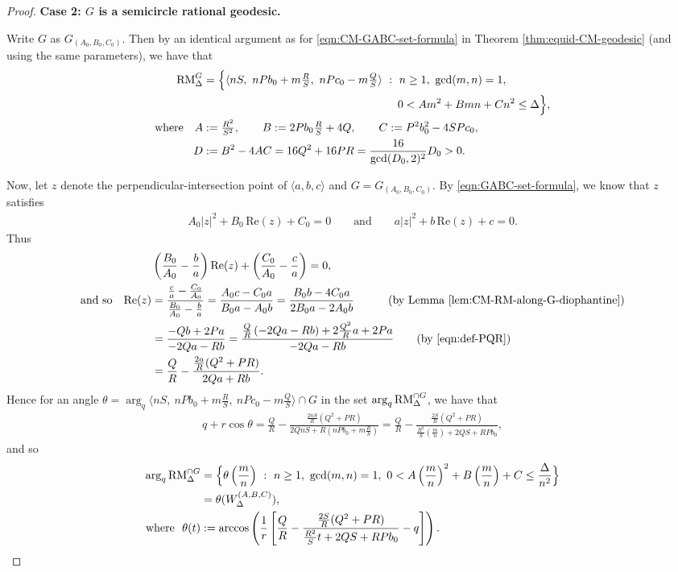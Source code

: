 \documentclass[11pt,letterpaper,reqno]{amsart}
\numberwithin{equation}{section}
\numberwithin{figure}{section}
\numberwithin{table}{section}
\newcommand{\lrp}[1]{\left(#1\right)}
\newcommand{\lrb}[1]{\left[#1\right]}
\newcommand{\RM}{\textnormal{RM}}
\begin{document}
\begin{proof}
\noindent\textbf{Case 2: $G$ is a semicircle rational geodesic.}

Write $G$ as $G_{(A_0,B_0,C_0)}$. Then by an identical argument as for \eqref{eqn:CM-GABC-set-formula} in Theorem \ref{thm:equid-CM-geodesic} (and using the same parameters), we have that
\begin{align}
    \RM^{G}_{\Delta} 
    &= \Big\{\langle nS,~nPb_0+m\tfrac{R}{S},~nPc_0-m\tfrac{Q}{S} \rangle ~:~ n\ge 1,~ \gcd(m,n)=1,~ \\
    &\hspace{61mm} 0 < A m^2 + B mn + C n^2  \le \Delta
    \Big\}, \\
    \text{where}\quad  A&:=\tfrac{R^2}{S^2}, \qquad B := 2Pb_0 \tfrac{R}{S}+4Q, \qquad C := P^2b_0^2-4SPc_0,  \\
     D &:= B^2 -4A C = 16Q^2+16PR = \frac{16}{\gcd(D_0,2)^2} D_0 > 0.
\end{align}

Now, let $z$ denote the perpendicular-intersection point of $\langle a,b,c\rangle$ and $G=G_{(A_0,B_0,C_0)}$. By \eqref{eqn:GABC-set-formula}, we know that $z$ satisfies
\begin{align}
    A_0|z|^2 + B_0 \, \mathrm{Re}(z) + C_0 = 0 \qquad \text{and}\qquad a|z|^2 + b \, \mathrm{Re}(z) + c = 0.
\end{align}
Thus
\begin{align}
    &\lrp{\frac{B_0}{A_0} - \frac ba} \mathrm{Re}(z) + \lrp{\frac{C_0}{A_0} - \frac ca} = 0, \\
    \text{and so }\ \ \mathrm{Re}(z) &= \frac{\frac ca -\frac{C_0}{A_0}}{\frac{B_0}{A_0} - \frac ba} = \frac{A_0c-C_0a}{B_0a-A_0b} = \frac{B_0b-4C_0a}{2B_0a-2A_0b} \qquad\quad \text{(by Lemma \ref{lem:CM-RM-along-G-diophantine})} \\
    &= \frac{-Qb+2Pa}{-2Qa-Rb} = \frac{\frac{Q}{R}\lrp{-2Qa-Rb} + 2\frac{Q^2}{R}a + 2Pa}{-2Qa-Rb} \quad\quad \text{(by \eqref{eqn:def-PQR})}\\
    &= \frac{Q}{R} -  \frac{\frac{2a}{R}(Q^2+PR)}{2Qa+Rb}.
\end{align}
Hence for an angle $\theta=\arg_q \langle nS,~nPb_0+m\tfrac{R}{S},~nPc_0-m\tfrac{Q}{S} \rangle \cap G$ in the set $\mathrm{arg}_q\, \RM^{\cap G}_{\Delta}$, we have that 
\begin{align}
    q+r \cos\theta = \frac{Q}{R} -  \frac{\frac{2nS}{R}(Q^2+PR)}{2QnS+R\lrp{nPb_0+m\tfrac{R}{S}}} = 
    \frac{Q}{R} - \frac{\frac{2S}{R}(Q^2+PR)}{\frac{R^2}{S}\lrp{\frac mn} +2QS+RPb_0  },
\end{align}
and so
\begin{align}
    \arg_q \RM^{\cap G}_{\Delta} 
    &= \Big\{\theta \lrp{\frac{m}{n}} ~:~ n\ge 1,~ \gcd(m,n)=1,~   0  < A \lrp{\frac{m}{n}}^2 + B \lrp{\frac{m}{n}} + C  \le \frac{\Delta}{n^2}
    \Big\} \\
    &= \theta(W_{\Delta}^{(A,B,C)}), \\
    \text{where }\ \theta(t) &:= \arccos\lrp{ \frac 1 r \lrb{
        \frac{Q}{R} - \frac{\frac{2S}{R}(Q^2+PR)}{\frac{R^2}{S}t +2QS+RPb_0  }
    - q}}.
\end{align}


\end{proof}
\end{document}
